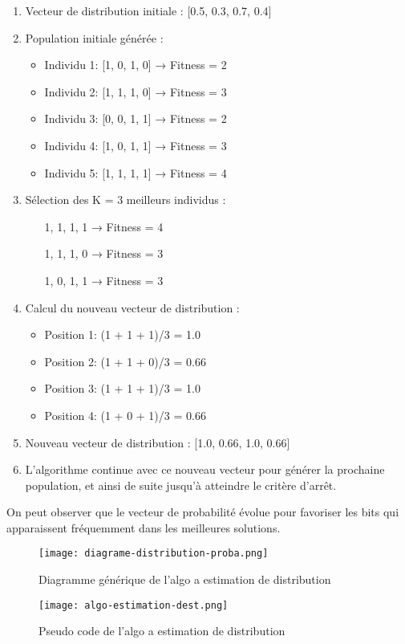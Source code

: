 \documentclass{article}
\begin{document}
\begin{enumerate}
\item Vecteur de distribution initiale : [0.5, 0.3, 0.7, 0.4]

\item Population initiale générée :
    \begin{itemize}
    \item Individu 1: [1, 0, 1, 0] → Fitness = 2
    \item Individu 2: [1, 1, 1, 0] → Fitness = 3
    \item Individu 3: [0, 0, 1, 1] → Fitness = 2
    \item Individu 4: [1, 0, 1, 1] → Fitness = 3
    \item Individu 5: [1, 1, 1, 1] → Fitness = 4
    \end{itemize}

\item Sélection des K = 3 meilleurs individus :
    \begin{itemize}
    \item [1, 1, 1, 1] → Fitness = 4
    \item [1, 1, 1, 0] → Fitness = 3
    \item [1, 0, 1, 1] → Fitness = 3
    \end{itemize}

\item Calcul du nouveau vecteur de distribution :
    \begin{itemize}
    \item Position 1: (1 + 1 + 1)/3 = 1.0
    \item Position 2: (1 + 1 + 0)/3 = 0.66
    \item Position 3: (1 + 1 + 1)/3 = 1.0
    \item Position 4: (1 + 0 + 1)/3 = 0.66
    \end{itemize}

\item Nouveau vecteur de distribution : [1.0, 0.66, 1.0, 0.66]

\item L'algorithme continue avec ce nouveau vecteur pour générer la prochaine population, et ainsi de suite jusqu'à atteindre le critère d'arrêt.
\end{enumerate}
On peut observer que le vecteur de probabilité évolue pour favoriser les bits qui apparaissent fréquemment dans les meilleures solutions.

\begin{figure}[h]
\centering
\texttt{[image: diagrame-distribution-proba.png]}
\caption{Diagramme générique de l'algo a estimation de distribution}
\label{fig:distribution-proba}
\end{figure}

\begin{figure}
    \centering
    \texttt{[image: algo-estimation-dest.png]}
    \caption{Pseudo code de l'algo a estimation de distribution}
    \label{fig:enter-label}
\end{figure}
\end{document}

